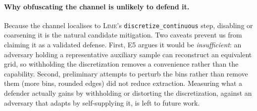 \documentclass[sigconf,anonymous,review]{acmart}
\begin{document}
\paragraph{Why obfuscating the channel is unlikely to defend it.} Because the channel localises to \textsc{Lime}'s
\texttt{discretize\_continuous} step, disabling or coarsening it is the natural candidate mitigation.
Two caveats prevent us from claiming it as a validated defense. First, E5 argues it would be
\emph{insufficient}: an adversary holding a representative auxiliary sample can reconstruct an
equivalent grid, so withholding the discretization removes a convenience rather than the capability.
Second, preliminary attempts to perturb the bins rather than remove them (more bins, rounded edges)
did not reduce extraction. Measuring what a defender actually gains by withholding or distorting the
discretization, against an adversary that adapts by self-supplying it, is left to future work.
\end{document}
